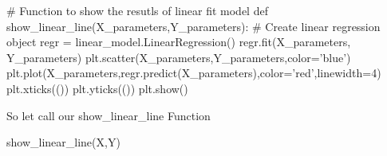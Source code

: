  
 
# Function to show the resutls of linear fit model
def show_linear_line(X_parameters,Y_parameters):
 # Create linear regression object
 regr = linear_model.LinearRegression()
 regr.fit(X_parameters, Y_parameters)
 plt.scatter(X_parameters,Y_parameters,color='blue')
 plt.plot(X_parameters,regr.predict(X_parameters),color='red',linewidth=4)
 plt.xticks(())
 plt.yticks(())
 plt.show()

 
So let call our show_linear_line Function
 
show_linear_line(X,Y)

